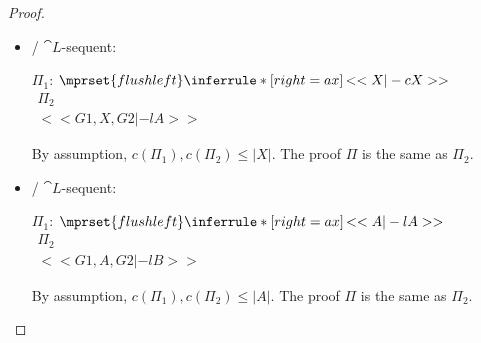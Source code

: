 \begin{proof}
\begin{enumerate}
\begin{itemize}
    \item \ElledruleTXXaxName / $\cat{L}$-sequent:
      \begin{center}
        \scriptsize
        $\Pi_1$:
        \begin{math}
          $$\mprset{flushleft}
          \inferrule* [right={\tiny ax}] {
            \,
          }{<<X |-c X>>}
        \end{math}
        \qquad\qquad
        \begin{math}
          \begin{array}{c}
            \Pi_2 \\
            {<<G1, X, G2 |-l A>>}
          \end{array}
        \end{math}
      \end{center}
      By assumption, $c(\Pi_1),c(\Pi_2)\leq |X|$. The proof $\Pi$ is the same as $\Pi_2$.

    \item \ElledruleSXXaxName / $\cat{L}$-sequent:
      \begin{center}
        \scriptsize
        $\Pi_1$:
        \begin{math}
          $$\mprset{flushleft}
          \inferrule* [right={\tiny ax}] {
            \,
          }{<<A |-l A>>}
        \end{math}
        \qquad\qquad
        \begin{math}
          \begin{array}{c}
            \Pi_2 \\
            {<<G1, A, G2 |-l B>>}
          \end{array}
        \end{math}
      \end{center}
      By assumption, $c(\Pi_1),c(\Pi_2)\leq |A|$. The proof $\Pi$ is the same as $\Pi_2$.


\end{itemize}
\end{enumerate}
\end{proof}
